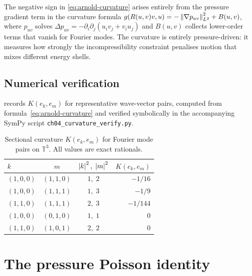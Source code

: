\begin{remark}\label{rem:pressure-dominant}
  The negative sign in \eqref{eq:arnold-curvature} arises entirely from the
  pressure gradient term in the curvature formula
  $g(R(u,v)v,u) = -\left\lVert \nabla p_{uv} \right\rVert^2_{L^{2}} + B(u,v)$,
  where $p_{uv}$ solves $\Delta p_{uv} = -\partial_i\partial_j(u_i v_j + v_i u_j)$
  and $B(u,v)$ collects lower-order terms that vanish for Fourier modes.
  The curvature is entirely pressure-driven: it measures how strongly the
  incompressibility constraint penalises motion that mixes different energy shells.
\end{remark}

\subsection{Numerical verification}

 records $K(e_k, e_m)$ for representative wave-vector pairs,
computed from formula~\eqref{eq:arnold-curvature} and verified symbolically
in the accompanying SymPy script \texttt{ch04\_curvature\_verify.py}.

\begin{table}[ht]
  \centering
  \caption{Sectional curvature $K(e_k, e_m)$ for Fourier mode pairs on $\mathbb{T}^3$.
           All values are exact rationals.}\label{tab:arnold-curvature}
  \begin{tabular}{lccr}
    \toprule
    $k$ & $m$ & $\left\lvert k \right\rvert^2,\;\left\lvert m \right\rvert^2$ & $K(e_k,e_m)$ \\
    \midrule
    $(1,0,0)$ & $(1,1,0)$ & $1,\;2$ & $-1/16$ \\
    $(1,0,0)$ & $(1,1,1)$ & $1,\;3$ & $-1/9$  \\
    $(1,1,0)$ & $(1,1,1)$ & $2,\;3$ & $-1/144$ \\
    $(1,0,0)$ & $(0,1,0)$ & $1,\;1$ & $0$      \\
    $(1,1,0)$ & $(1,0,1)$ & $2,\;2$ & $0$      \\
    \bottomrule
  \end{tabular}
\end{table}

\section{The pressure Poisson identity}\label{sec:curv-poisson}

